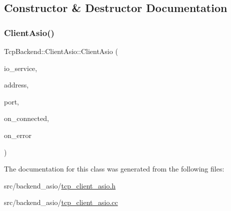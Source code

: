 \subsection{Constructor \& Destructor Documentation}
\mbox{\label{classTcpBackend_1_1ClientAsio_ac745c20f4213037c842d2d7c89397e84}} 
\subsubsection{\texorpdfstring{Client\+Asio()}{ClientAsio()}}
{\footnotesize\ttfamily Tcp\+Backend\+::\+Client\+Asio\+::\+Client\+Asio (\begin{DoxyParamCaption}\item[{asio\+::io\+\_\+service $\ast$}]{io\+\_\+service,  }\item[{const std\+::string \&}]{address,  }\item[{const std\+::string \&}]{port,  }\item[{const \hyperlink{namespaceTcpBackend_afa30fa9a706436148fb2857a2174e625}{On\+Connected} \&}]{on\+\_\+connected,  }\item[{const \hyperlink{namespaceTcpBackend_a17e8f044749312a6692cd0135565cbc4}{On\+Error} \&}]{on\+\_\+error }\end{DoxyParamCaption})}



The documentation for this class was generated from the following files\+:\begin{DoxyCompactItemize}
\item 
src/backend\+\_\+asio/\hyperlink{tcp__client__asio_8h}{tcp\+\_\+client\+\_\+asio.\+h}\item 
src/backend\+\_\+asio/\hyperlink{tcp__client__asio_8cc}{tcp\+\_\+client\+\_\+asio.\+cc}\end{DoxyCompactItemize}
